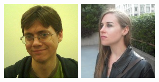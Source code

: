 \documentclass{beamer}
\begin{document}
\begin{frame}
\begin{columns}
        \begin{column}{.2\textwidth}
            \begin{center}
                \includegraphics[width=.8\textwidth]{img/fellows/mark-stillwell_thumb.jpg}
                \vspace{.2cm}
                \includegraphics[width=.8\textwidth]{img/fellows/melodee-helene-beals_thumb.jpg}
                \vspace{.2cm}

\end{center}
\end{column}
\end{columns}
\end{frame}
\end{document}
